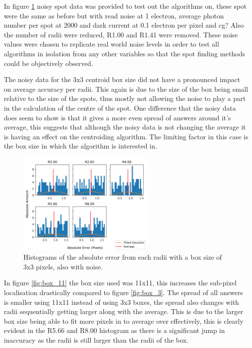 \documentclass[aps,pra,a4paper,nofootinbib,onecolumn,tightenlines,longbibliography,12pt,amsfonts,amssymb,amsmath,floatfix]{revtex4-2} %
\begin{document}
  In figure \ref{fig:box_3_noise} noisy spot data was provided to test out the algorithms on, 
  these spot were the same as before but with read noise at 1 electron, average photon number 
  per spot at 2000 and dark current at 0.1 electron per pixel and cg? Also the number of radii 
  were reduced, R1.00 and R1.41 were removed. These noise values were chosen 
  to replicate real world noise levels in order to test all algorithms in isolation from any other 
  variables so that the spot finding methods could be objectively observed. 

  The noisy data for the 3x3 centroid box size did not have a pronounced impact on average 
  accuracy per radii. This again is due to the size of the box being small relative to the 
  size of the spots, thus mostly not allowing the noise to play a part in the calculation of the 
  centre of the spot. One difference that the noisy data does seem to show is that it gives a more 
  even spread of answers around it's average, this suggests that although the noisy data 
  is not changing the average it is having an effect on the centroiding algorithm. The limiting factor 
  in this case is the box size in which the algorithm is interested in.

  \begin{figure}[H]
    \begin{center}
      \includegraphics[width=0.6\textwidth]{project_pics/noise_cen_scatter_3.png}
    \end{center}
    \caption{Histograms of the absolute error from each radii with a box size of 3x3 pixels, also with noise.}
    \label{fig:box_3_noise}
  \end{figure}
  


  In figure \ref{fig:box_11} the box size used was 11x11, this increases the sub-pixel localisation 
  drastically compared to figure \ref{fig:box_3}. The spread of all answers is smaller using 11x11 instead of using 3x3
  boxes, the spread also changes with radii sequentially getting larger along with the average. 
  This is due to the larger box size being able to fit 
  more pixels in to average over effectively, this is clearly evident in the R5.66 and R8.00 histogram as there is a 
  significant jump in inaccuracy as the radii is still larger than the radii of the box. 
\end{document}
